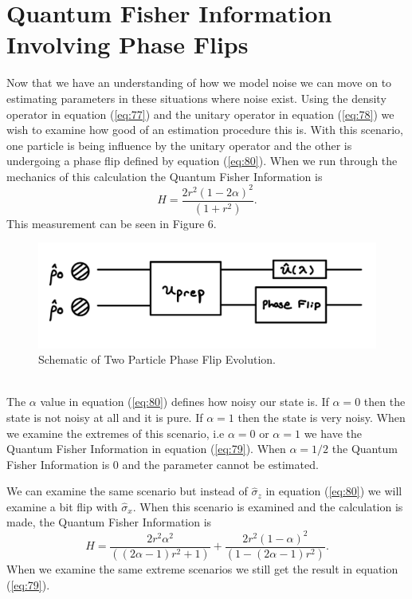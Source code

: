 \documentclass[twocolumn]{article}
\begin{document}
\section*{Quantum Fisher Information Involving Phase Flips}
Now that we have an understanding of how we model noise we can move on to estimating parameters in these situations where noise exist. Using the density operator in equation (\ref{eq:77}) and the unitary operator in equation (\ref{eq:78}) we wish to examine how good of an estimation procedure this is. With this scenario, one particle is being influence by the unitary operator and the other is undergoing a phase flip defined by equation (\ref{eq:80}). When we run through the mechanics of this calculation the Quantum Fisher Information is
\begin{equation}\label{eq:91}
H=\frac{2r^2(1-2\alpha)^2}{(1+r^2)}.
\end{equation}
This measurement can be seen in Figure 6.
\begin{figure}[htpb]
\begin{center}
\includegraphics[width=0.90\linewidth]{Two-Particle-Phase-Flip.jpg}
\caption{Schematic of Two Particle Phase Flip Evolution.}
\end{center}
\end{figure}\\
The $\alpha$ value in equation (\ref{eq:80}) defines how noisy our state is. If $\alpha=0$ then the state is not noisy at all and it is pure. If $\alpha=1$ then the state is very noisy. When we examine the extremes of this scenario, i.e $\alpha=0$ or $\alpha=1$ we have the Quantum Fisher Information in equation (\ref{eq:79}). When $\alpha=1/2$ the Quantum Fisher Information is 0 and the parameter cannot be estimated.

We can examine the same scenario but instead of $\hat{\sigma}_z$ in equation (\ref{eq:80}) we will examine a bit flip with $\hat{\sigma}_x$. When this scenario is examined and the calculation is made, the Quantum Fisher Information is
\begin{equation}\label{eq:92}
H=\frac{2r^2\alpha^2}{((2\alpha-1)r^2+1)}+\frac{2r^2(1-\alpha)^2}{(1-(2\alpha-1)r^2)}.
\end{equation}
When we examine the same extreme scenarios we still get the result in equation (\ref{eq:79}).
\end{document}
